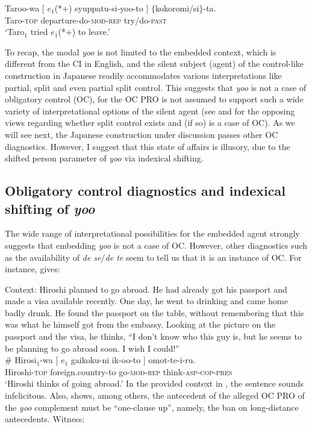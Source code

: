 \documentclass[output=paper]{langsci/langscibook}
\begin{document}
\ea\label{shimamu11} \gll Taroo-wa [  $e_1$(*+) syuppatu-si-yoo-to ] $\{$kokoromi/si$\}$-ta.\\
Taro-\textsc{top} {} {} departure-do-\textsc{mod-rep} {} \phantom{$\{$}try/do-\textsc{past}\\
\glt `Taro$_1$ tried $e_1$(*+) to leave.'
\z

To recap, the modal \textit{yoo} is not limited to the embedded context, which is different from the CI in English, and the silent subject (agent) of the control-like construction in Japanese readily accommodates various interpretations like partial, split and even partial split control. This suggests that \textit{yoo} is not a case of obligatory control (OC), for the OC PRO is not assumed to support such a wide variety of interpretational options of the silent agent (see \citealt{landau2000} and \citet{hornstein1999,hornstein2003} for the opposing views regarding whether split control exists and (if so) is a case of OC). As we will see next, the Japanese construction under discussion passes other OC diagnostics. However, I suggest that this state of affairs is illusory, due to the shifted person parameter of \textit{yoo} via indexical shifting.

\subsection{Obligatory control diagnostics and indexical shifting of \textit{yoo}}\largerpage[2]
The wide range of interpretational possibilities for the embedded agent strongly suggests that embedding \textit{yoo} is not a case of OC. However, other diagnostics such as the availability of \textit{de se}/\textit{de te} seem to tell us that it is an instance of OC. For instance, \citet{fujii2006} gives:

\ea\label{shimamu12} Context: Hiroshi planned to go abroad. He had already got his passport and made a visa available recently. One day, he went to drinking and came home badly drunk. He found the passport on the table, without remembering that this was what he himself got from the embassy. Looking at the picture on the passport and the visa, he thinks, ``I don't know who this guy is, but he seems to be planning to go abroad soon. I wish I could!''\\
\gll \# Hirosi$_1$-wa [ $e_1$ gaikoku-ni ik-oo-to ] omot-te-i-ru.\\
{} Hiroshi-\textsc{top} {} {} foreign.country-to go-\textsc{mod-rep} {} think-\textsc{asp-cop-pres}\\
\glt `Hiroshi thinks of going abroad.' \citep[][106]{fujii2006}
\z
In the provided context in , the sentence sounds infelicitous. Also, \citet{fujii2006} shows, among others, the antecedent of the alleged OC PRO of the \textit{yoo} complement must be ``one-clause up'', namely, the ban on long-distance antecedents. Witness:
\end{document}

